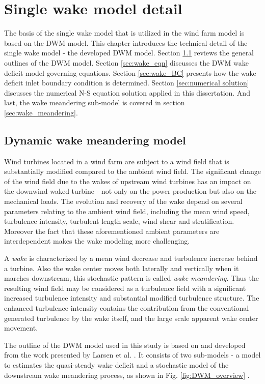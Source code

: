 \documentclass{umthesis}
\begin{document}
\chapter{Single wake model detail} \label{chap:DWM_detail}
The basis of the single wake model that is utilized in the wind farm model is based on the DWM model. This chapter introduces the technical detail of the single wake model - the developed DWM model. Section \ref{sec:DWM_overview} reviews the general outlines of the DWM model. Section \ref{sec:wake_eqn} discusses the DWM wake deficit model governing equations. Section \ref{sec:wake_BC} presents how the wake deficit inlet boundary condition is determined. Section \ref{sec:numerical solution} discusses the numerical N-S equation solution applied in this dissertation. And last, the wake meandering sub-model is covered in section \ref{sec:wake_meandering}.

\section{Dynamic wake meandering model}\label{sec:DWM_overview}
Wind turbines located in a wind farm are subject to a wind field that is substantially modified compared to the ambient wind field. The significant change of the wind field due to the wakes of upstream wind turbines has an impact on the downwind waked turbine - not only on the power production but also on the mechanical loads. The evolution and recovery of the wake depend on several parameters relating to the ambient wind field, including the mean wind speed, turbulence intensity, turbulent length scale, wind shear and stratification. Moreover the fact that these aforementioned ambient parameters are interdependent makes the wake modeling more challenging.

A \textit{wake} is characterized by a mean wind decrease and turbulence increase behind a turbine. Also the wake center moves both laterally and vertically when it marches downstream, this stochastic pattern is called \textit{wake meandering}. Thus the resulting wind field may be considered as a turbulence field with a significant increased turbulence intensity and substantial modified turbulence structure. The enhanced turbulence intensity contains the contribution from the conventional generated turbulence by the wake itself, and the large scale apparent wake center movement.

The outline of the DWM model used in this study is based on and developed from the work presented by Larsen et al. \cite{Larsen_wake}. It consists of two sub-models - a model to estimates the quasi-steady wake deficit and a stochastic model of the downstream wake meandering process, as shown in Fig. \ref{fig:DWM_overview} \cite{Keck_mixing}.
\end{document}
